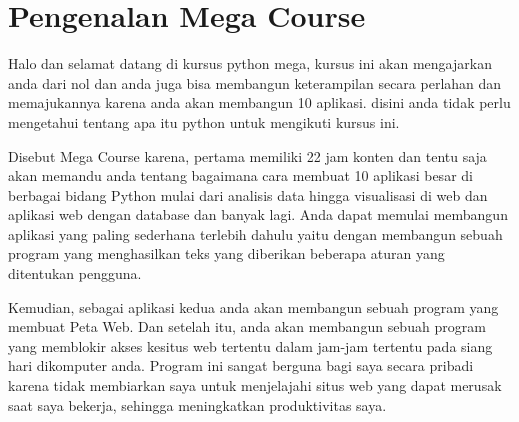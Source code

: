 \section{Pengenalan Mega Course}

Halo dan selamat datang di kursus python mega, kursus ini akan mengajarkan anda dari nol dan anda juga bisa membangun keterampilan secara perlahan dan memajukannya karena anda akan membangun 10 aplikasi. disini anda tidak perlu mengetahui tentang apa itu python untuk mengikuti kursus ini.

Disebut Mega Course karena, pertama memiliki 22 jam konten dan tentu saja akan memandu anda tentang bagaimana cara membuat 10 aplikasi besar di berbagai bidang Python mulai dari analisis data hingga visualisasi di web dan aplikasi web dengan database dan banyak lagi. Anda dapat memulai membangun aplikasi yang paling sederhana terlebih dahulu yaitu dengan membangun sebuah program yang menghasilkan teks yang diberikan beberapa aturan yang ditentukan pengguna.

Kemudian, sebagai aplikasi kedua anda akan membangun sebuah program yang membuat Peta Web. Dan setelah itu, anda akan membangun sebuah program yang memblokir akses kesitus web tertentu dalam jam-jam tertentu pada siang hari dikomputer anda. Program ini sangat berguna bagi saya secara pribadi karena tidak membiarkan saya untuk menjelajahi situs web yang dapat merusak saat saya bekerja, sehingga meningkatkan produktivitas saya.
